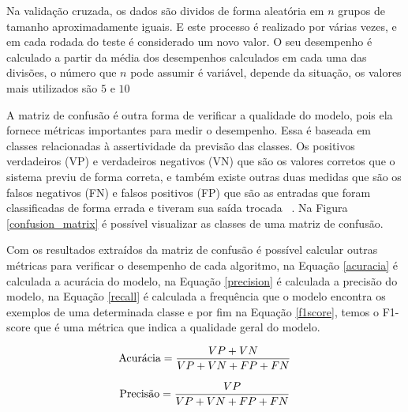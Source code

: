          Na validação cruzada, os dados são dividos de forma aleatória em $n$ grupos de tamanho aproximadamente iguais. E este processo 
          é realizado por várias vezes, e em cada rodada do teste é considerado um novo valor. O seu desempenho é calculado a partir da média
          dos desempenhos calculados em cada uma das divisões, o número que $n$ pode assumir é variável, depende da situação, os valores
          mais utilizados são $5$ e $10$~\cite{kohavi1995study}


          A matriz de confusão é outra forma de verificar a qualidade do modelo, pois ela fornece métricas importantes 
          para medir o desempenho. Essa é baseada em classes relacionadas à assertividade da previsão das classes. Os positivos verdadeiros (VP) e verdadeiros negativos (VN)
          que são os valores corretos que o sistema previu de forma correta, e também existe outras duas medidas que são os falsos negativos (FN) e falsos positivos (FP) que são 
          as entradas que foram classificadas de forma errada e tiveram sua saída trocada ~\cite{martin}. Na Figura \ref{confusion_matrix} é possível visualizar
          as classes de uma matriz de confusão.




          Com os resultados extraídos da matriz de confusão é possível calcular outras métricas para verificar o desempenho de cada algoritmo, 
          na Equação \ref{acuracia} é calculada a acurácia do modelo, na Equação \ref{precision} é calculada a precisão do modelo, na Equação \ref{recall} é
          calculada a frequência que o modelo encontra os exemplos de uma determinada classe e por fim na Equação \ref{f1score}, temos o F1-score que é uma métrica
          que indica a qualidade geral do modelo.

          \begin{equation}\label{acuracia}
            \begin{aligned}
              \textup{Acurácia} = \frac{VP+VN}{VP+VN+FP+FN}
          \end{aligned} 
          \end{equation}

          \begin{equation}\label{precision}
            \begin{aligned}
              \textup{Precisão} = \frac{VP}{VP+VN+FP+FN}
          \end{aligned} 
          \end{equation}

